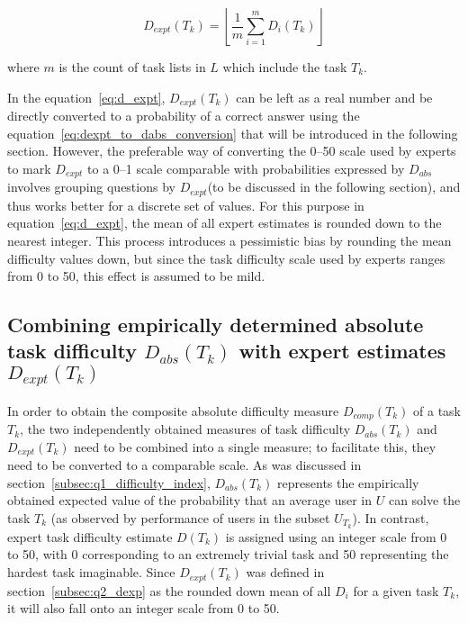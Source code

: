 \begin{equation} \label{eq:d_expt}
    D_{expt}(T_k) = \left \lfloor \frac{1} {m} \sum \limits_{i=1}^m D_i(T_k) \right \rfloor
\end{equation}

where $m$ is the count of task lists in $L$ which include the task $T_k$.

In the equation~\ref{eq:d_expt}, $D_{expt}(T_k)$ can be left as a real number and be directly converted to a probability of a correct answer using the equation~\ref{eq:dexpt_to_dabs_conversion} that will be introduced in the following section.
However, the preferable way of converting the 0--50 scale used by experts to mark $D_{expt}$ to a 0--1 scale comparable with probabilities expressed by $D_{abs}$ involves grouping questions by $D_{expt}$(to be discussed in the following section), and thus works better for a discrete set of values.
For this purpose in equation~\ref{eq:d_expt}, the mean of all expert estimates is rounded down to the nearest integer.
This process introduces a pessimistic bias by rounding the mean difficulty values down, but since the task difficulty scale used by experts ranges from 0 to 50, this effect is assumed to be mild.

\subsection{Combining empirically determined absolute task difficulty $D_{abs}(T_k)$ with expert estimates $D_{expt}(T_k)$} \label{subsec:q2_dcomp}

In order to obtain the composite absolute difficulty measure $D_{comp}(T_k)$ of a task $T_k$, the two independently obtained measures of task difficulty $D_{abs}(T_k)$ and $D_{expt}(T_k)$ need to be combined into a single measure;
to facilitate this, they need to be converted to a comparable scale.
As was discussed in section~\ref{subsec:q1_difficulty_index}, $D_{abs}(T_k)$ represents the empirically obtained expected value of the probability that an average user in $U$ can solve the task $T_k$ (as observed by performance of users in the subset $U_{T_k}$).
In contrast, expert task difficulty estimate $D(T_k)$ is assigned using an integer scale from 0 to 50, with 0 corresponding to an extremely trivial task and 50 representing the hardest task imaginable.
Since $D_{expt}(T_k)$ was defined in section~\ref{subsec:q2_dexp} as the rounded down mean of all $D_i$ for a given task $T_k$, it will also fall onto an integer scale from 0 to 50.

